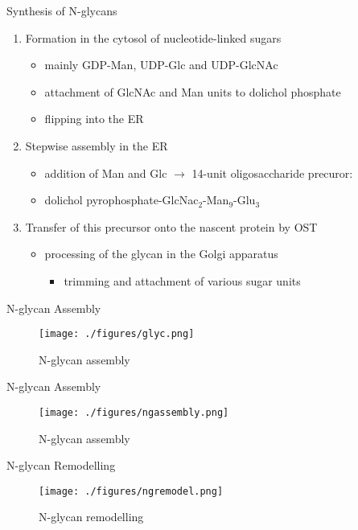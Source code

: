 \documentclass[presentation, smaller]{beamer}
\begin{document}
\begin{frame}[label={sec:orgd2aa442}]{Synthesis of N-glycans}
\begin{enumerate}
\item Formation in the cytosol of nucleotide-linked sugars
\begin{itemize}
\item mainly GDP-Man, UDP-Glc and UDP-GlcNAc
\item attachment of GlcNAc and Man units to dolichol phosphate
\item flipping into the ER
\end{itemize}
\item Stepwise assembly in the ER
\begin{itemize}
\item addition of Man and Glc \(\to\) 14-unit oligosaccharide precuror:
\item dolichol pyrophosphate-GlcNac\(_{\text{2}}\)-Man\(_{\text{9}}\)-Glu\(_{\text{3}}\)
\end{itemize}
\item Transfer of this precursor onto the nascent protein by OST
\begin{itemize}
\item processing of the glycan in the Golgi apparatus
\begin{itemize}
\item trimming and attachment of various sugar units
\end{itemize}
\end{itemize}
\end{enumerate}
\end{frame}

\begin{frame}[label={sec:org35a63f3}]{N-glycan Assembly}
\begin{figure}[htbp]
\centering
\texttt{[image: ./figures/glyc.png]}
\caption{\label{fig:orgfa81ad7}
N-glycan assembly}
\end{figure}
\end{frame}


\begin{frame}[label={sec:orgdb87a9e}]{N-glycan Assembly}
\begin{figure}[htbp]
\centering
\texttt{[image: ./figures/ngassembly.png]}
\caption{\label{fig:org81898e1}
N-glycan assembly}
\end{figure}
\end{frame}

\begin{frame}[label={sec:orgfdf7ad6}]{N-glycan Remodelling}
\begin{figure}[htbp]
\centering
\texttt{[image: ./figures/ngremodel.png]}
\caption{\label{fig:org050533c}
N-glycan remodelling}
\end{figure}
\end{frame}
\end{document}
